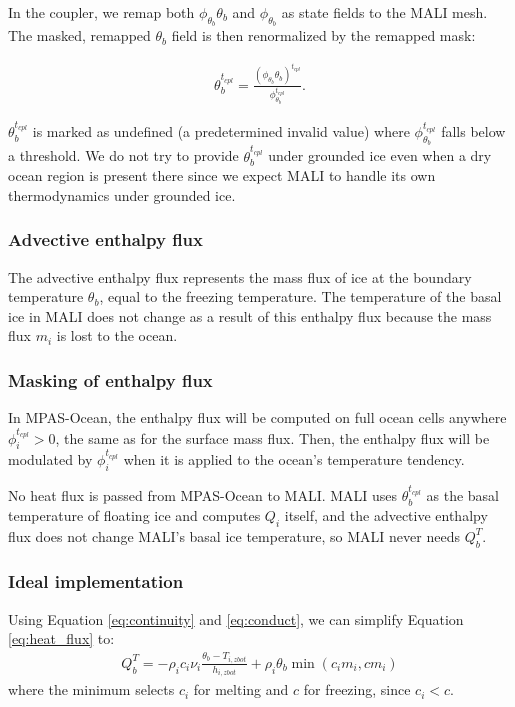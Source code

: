 \documentclass[11pt]{report}
\newcommand{\bea}{\begin{eqnarray}}
\newcommand{\eea}{\end{eqnarray}}
\begin{document}
In the coupler, we remap both $\phi_{\theta_b} \theta_b$ and $\phi_{\theta_b}$ as state fields to the MALI mesh.  The masked, remapped $\theta_b$ field is then renormalized by the remapped mask:

\bea
    \theta_b^{t_{cpl}} = \frac{\left(\phi_{\theta_b} \theta_b\right)^{t_{cpl}}}{\phi_{\theta_b}^{t_{cpl}}}.
\eea

$\theta_b^{t_{cpl}}$ is marked as undefined (a predetermined invalid value) where $\phi_{\theta_b}^{t_{cpl}}$ falls below a threshold.  We do not try to provide $\theta_b^{t_{cpl}}$ under grounded ice even when a dry ocean region is present there since we expect MALI to handle its own thermodynamics under grounded ice.

\subsubsection{Advective enthalpy flux}

The advective enthalpy flux represents the mass flux of ice at the boundary temperature $\theta_b$, equal to the freezing temperature. The temperature of the basal ice in MALI does not change as a result of this enthalpy flux because the mass flux $m_i$ is lost to the ocean.

\subsubsection{Masking of enthalpy flux}

In MPAS-Ocean, the enthalpy flux will be computed on full ocean cells anywhere $\phi_i^{t_{cpl}} > 0$, the same as for the surface mass flux.  Then, the enthalpy flux will be modulated by $\phi_i^{t_{cpl}}$ when it is applied to the ocean's temperature tendency.

No heat flux is passed from MPAS-Ocean to MALI.  MALI uses $\theta_b^{t_{cpl}}$ as the
basal temperature of floating ice and computes $Q_i$ itself, and the advective enthalpy
flux does not change MALI's basal ice temperature, so MALI never needs $Q_b^T$.

\subsubsection{Ideal implementation}

Using Equation \ref{eq:continuity} and \ref{eq:conduct}, we can simplify Equation \ref{eq:heat_flux} to:
\bea
    Q_b^T = - \rho_i c_i \nu_i \frac{\theta_b - T_{i,zbot}}{h_{i,zbot}} +\rho_i \theta_b \min(c_i m_i, c m_i)\label{eq:heat_flux_ideal}
\eea
where the minimum selects $c_i$ for melting and $c$ for freezing, since $c_i < c$.
\end{document}
